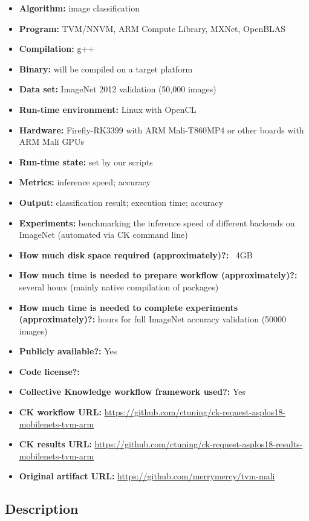 \documentclass[sigplan]{acmart}
\begin{document}
{\small
\begin{itemize}
  \item {\bf Algorithm:} image classification
  \item {\bf Program:} TVM/NNVM, ARM Compute Library, MXNet, OpenBLAS
  \item {\bf Compilation:} g++
  \item {\bf Binary:} will be compiled on a target platform
  \item {\bf Data set:} ImageNet 2012 validation (50,000 images)
  \item {\bf Run-time environment:} Linux with OpenCL
  \item {\bf Hardware:} Firefly-RK3399 with ARM Mali-T860MP4 or other boards with ARM Mali GPUs
  \item {\bf Run-time state:} set by our scripts
  \item {\bf Metrics:} inference speed; accuracy
  \item {\bf Output:} classification result; execution time; accuracy
  \item {\bf Experiments:} benchmarking the inference speed of different backends on ImageNet (automated via CK command line)
  \item {\bf How much disk space required (approximately)?:} ~4GB
  \item {\bf How much time is needed to prepare workflow (approximately)?:} several hours (mainly native compilation of packages)
  \item {\bf How much time is needed to complete experiments (approximately)?:} hours for full ImageNet accuracy validation (50000 images)
  \item {\bf Publicly available?:} Yes
  \item {\bf Code license?:} 
  \item {\bf Collective Knowledge workflow framework used?:} Yes
  \item {\bf CK workflow URL:} \url{https://github.com/ctuning/ck-request-asplos18-mobilenets-tvm-arm }
  \item {\bf CK results URL:} \url{https://github.com/ctuning/ck-request-asplos18-results-mobilenets-tvm-arm}
  \item {\bf Original artifact URL:} \url{https://github.com/merrymercy/tvm-mali}
\end{itemize}

\subsection{Description}

}
\end{document}
